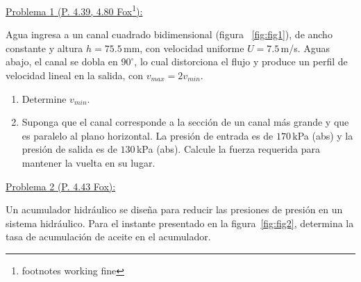 \documentclass[11pt]{report}
\begin{document}

\vspace{1cm}


\vspace{1cm}

\underline {Problema 1 (P. 4.39, 4.80 Fox\footnote{footnotes working fine}):}

\vspace{0.2cm}

Agua ingresa a un canal cuadrado bidimensional (figura ~\ref{fig:fig1}), de ancho constante y altura $h=75.5$\,mm, con velocidad uniforme $U=7.5$\,m/s. Aguas abajo, el canal se dobla en $90^\circ$, lo cual distorciona el flujo y produce un perfil de velocidad lineal en la salida, con $v_{max}=2v_{min}$. 
\begin{enumerate}[label=\alph*)]
\item Determine $v_{min}$.
\item Suponga que el canal corresponde a la secci\'on de un canal m\'as grande y que es paralelo al plano horizontal. La presi\'on de entrada es de $170$\,kPa (abs) y la presi\'on de salida es de $130$\,kPa (abs). Calcule la fuerza requerida para mantener la vuelta en su lugar.
\end{enumerate}

\vspace{1cm}


\underline {Problema 2 (P. 4.43 Fox):}

\vspace{0.2cm}

Un acumulador hidr\'aulico se diseña para reducir las presiones de presi\'on en un sistema hidr\'aulico. Para el instante presentado en la figura~\ref{fig:fig2}, determina la tasa de acumulaci\'on de aceite en el acumulador.
\end{document}

